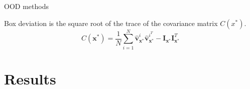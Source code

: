 \documentclass[10pt, aspectratio=169]{beamer}
\begin{document}
\begin{frame}[allowframebreaks]{OOD methods}
\begin{itemize}
\begin{itemize}
            Box deviation is the square root of the trace of the covariance matrix $C(x^{*})$.
            \begin{equation}
                C\left(\mathbf{x}^{*}\right)=\frac{1}{N} \sum_{i=1}^{N} \hat{\mathbf{v}}_{\mathbf{x}^{*}}^{i} \hat{\mathbf{v}}_{\mathbf{x}^{*}}^{i^{T}}-\mathbf{I}_{\mathbf{x}^{*}} \mathbf{I}_{\mathbf{x}^{*}}^{T}
            \end{equation}

        \end{itemize}
    \end{itemize}
\end{frame}

\section{Results}
\end{document}
